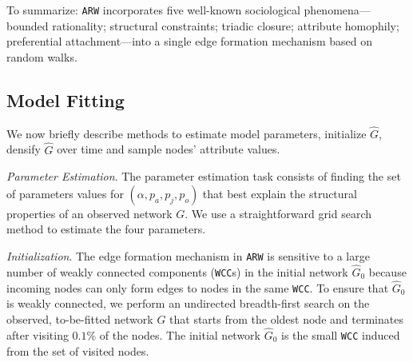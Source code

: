 To summarize: \texttt{ARW} incorporates five well-known sociological phenomena---
bounded rationality; structural constraints; triadic closure; attribute homophily; preferential attachment---into a single edge
formation mechanism based on random walks.




\subsection{Model Fitting}
\label{sub:Model Fitting}

We now briefly describe methods to estimate model parameters,
initialize $\hat{G}$, densify $\hat{G}$ over time and sample nodes' attribute values.

\textit{Parameter Estimation}.
The parameter estimation task consists of finding the set of
parameters values for $(\alpha, p_a, p_j, p_o)$ that best explain the structural properties
of an observed network $G$. We use a straightforward grid search method to estimate
the four parameters.

\textit{Initialization}. The edge formation mechanism in \texttt{ARW} is
sensitive to a large number of weakly connected components (\texttt{WCC}s) in the
initial network $\hat{G}_0$ because incoming nodes can only form edges to nodes
in the same \texttt{WCC}. To ensure that $\hat{G}_0$ is weakly
connected, we perform an undirected breadth-first search on the observed,
to-be-fitted network $G$ that starts from the oldest node and terminates after
visiting $0.1\%$ of the nodes. The initial network $\hat{G}_0$ is the small \texttt{WCC}
induced from the set of visited nodes.


